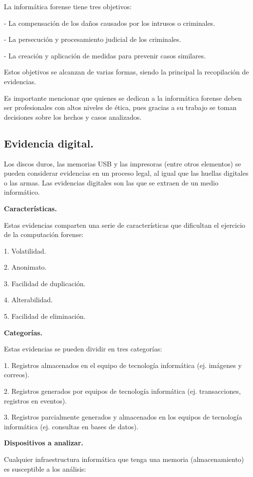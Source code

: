La informática forense tiene tres objetivos:

- La compensación de los daños causados por los intrusos o criminales.

- La persecución y procesamiento judicial de los criminales.

- La creación y aplicación de medidas para prevenir casos similares.

Estos objetivos se alcanzan de varias formas, siendo la principal la recopilación de evidencias.

Es importante mencionar que quienes se dedican a la informática forense deben ser profesionales con altos niveles de ética, pues gracias a su trabajo se toman decisiones sobre los hechos y casos analizados.

\subsection{Evidencia digital.}

Los discos duros, las memorias USB y las impresoras (entre otros elementos) se pueden considerar evidencias en un proceso legal, al igual que las huellas digitales o las armas. Las evidencias digitales son las que se extraen de un medio informático.

\textbf{Características.}

Estas evidencias comparten una serie de características que dificultan el ejercicio de la computación forense:

1. Volatilidad.

2. Anonimato.

3. Facilidad de duplicación.

4. Alterabilidad.

5. Facilidad de eliminación.

\textbf{Categorías.}

Estas evidencias se pueden dividir en tres categorías:

1. Registros almacenados en el equipo de tecnología informática (ej. imágenes y correos).

2. Registros generados por equipos de tecnología informática (ej. transacciones, registros en eventos).

3. Registros parcialmente generados y almacenados en los equipos de tecnología informática (ej. consultas en bases de datos).

\textbf{Dispositivos a analizar.}

Cualquier infraestructura informática que tenga una memoria (almacenamiento) es susceptible a los análisis:

